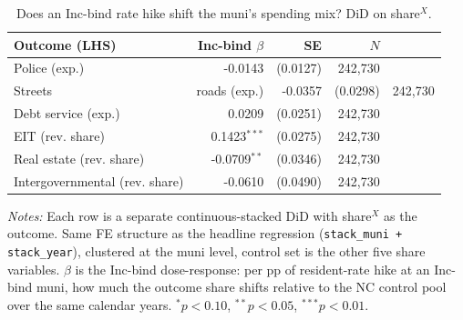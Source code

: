 \begin{table}[H]
  \centering
  \caption{Does an Inc-bind rate hike shift the muni's spending mix? DiD on share$^X$.}
  \label{tab:spending_did}
  \small
  \begin{tabular}{lrrr}
    \toprule
    Outcome (LHS) & Inc-bind $\beta$ & SE & $N$ \\
    \midrule
    Police (exp.) & -0.0143 & (0.0127) & 242,730 \\
    Streets & roads (exp.) & -0.0357 & (0.0298) & 242,730 \\
    Debt service (exp.) & 0.0209 & (0.0251) & 242,730 \\
    EIT (rev. share) & 0.1423$^{***}$ & (0.0275) & 242,730 \\
    Real estate (rev. share) & -0.0709$^{**}$ & (0.0346) & 242,730 \\
    Intergovernmental (rev. share) & -0.0610 & (0.0490) & 242,730 \\
    \bottomrule
  \end{tabular}
  \vspace{0.3em}
  \begin{minipage}{0.95\textwidth}
    \footnotesize \textit{Notes:} Each row is a separate
    continuous-stacked DiD with share$^X$ as the outcome.
    Same FE structure as the headline regression
    (\texttt{stack\_muni + stack\_year}), clustered at
    the muni level, control set is the other five share
    variables. $\beta$ is the Inc-bind dose-response: per
    pp of resident-rate hike at an Inc-bind muni, how much
    the outcome share shifts relative to the NC control
    pool over the same calendar years.
    $^{*}p<0.10$, $^{**}p<0.05$, $^{***}p<0.01$.
  \end{minipage}
\end{table}
